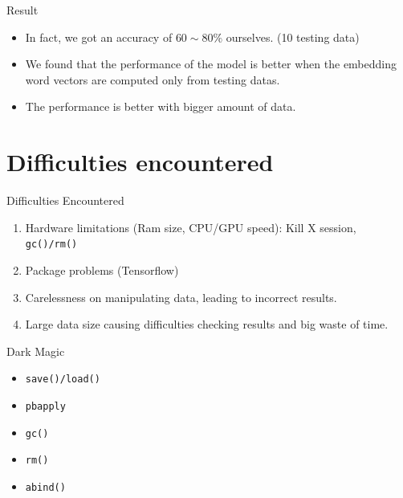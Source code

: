 \documentclass{beamer}
\begin{document}
\begin{frame}{Result}
    \begin{itemize}
        \item In fact, we got an accuracy of $60\sim 80\%$ ourselves. (10 testing data)
        \item We found that the performance of the model is better 
            when the embedding word vectors are computed only from testing datas.
        \item The performance is better with bigger amount of data.
    \end{itemize}
\end{frame}
\section{Difficulties encountered}%
\label{sec:difficulties_encountered}


\begin{frame}{Difficulties Encountered}
	\begin{enumerate}
		\item Hardware limitations (Ram size, CPU/GPU speed): Kill X session, \texttt{gc()/rm()}
		\item Package problems (Tensorflow)
		\item Carelessness on manipulating data, leading to incorrect results.
		\item Large data size causing difficulties checking results and big waste of time.
	\end{enumerate}
\end{frame}


\begin{frame}{Dark Magic}
	\begin{itemize}
		\item \texttt{save()/load()}
		\item \texttt{pbapply}
		\item \texttt{gc()}
		\item \texttt{rm()}
		\item \texttt{abind()}
	\end{itemize}
	
\end{frame}
\end{document}
